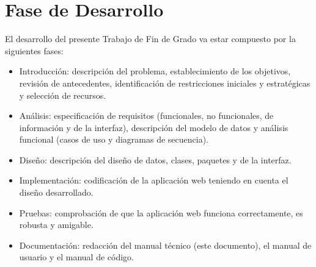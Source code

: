 \chapter{Fase de Desarrollo}\label{c-fasedesarrollo}


El desarrollo del presente Trabajo de Fin de Grado va estar compuesto por la siguientes fases:

\begin{itemize}
     \item Introducción: descripción del problema, establecimiento de los objetivos, revisión de antecedentes, identificación de restricciones iniciales y estratégicas y selección de recursos.
     \item Análisis: especificación de requisitos (funcionales, no funcionales, de información y de la interfaz), descripción del modelo de datos y análisis funcional (casos de uso y diagramas de secuencia).
    
     \item Diseño: descripción del diseño de datos, clases, paquetes y de la interfaz.
    
     \item Implementación: codificación de la aplicación web teniendo en cuenta el diseño desarrollado.
    
     \item Pruebas: comprobación de que la aplicación web funciona correctamente, es robusta y amigable.
    
     \item Documentación: redacción del manual técnico (este documento), el manual de usuario y el manual de código.
 \end{itemize}